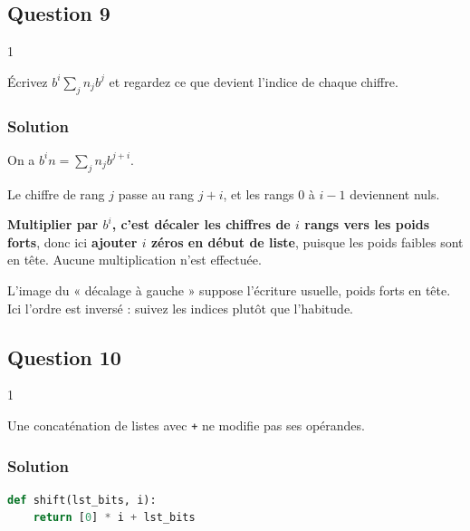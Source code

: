 \documentclass[11pt,a4paper]{article}
\begin{document}
\hypertarget{question-9}{%
\subsection{Question 9}\label{question-9}}

\begin{indication}{1}

Écrivez \(b^i \sum_j n_j b^j\) et regardez ce que devient l'indice de chaque chiffre.

\end{indication}

\hypertarget{solution-8}{%
\subsubsection{Solution}\label{solution-8}}

On a \(b^i n = \sum_j n_j b^{j+i}\).

Le chiffre de rang \(j\) passe au rang \(j+i\), et les rangs \(0\) à \(i-1\) deviennent nuls.

\textbf{Multiplier par \(b^i\), c'est décaler les chiffres de \(i\) rangs vers les poids forts}, donc ici \textbf{ajouter \(i\) zéros en début de liste}, puisque les poids faibles sont en tête. Aucune multiplication n'est effectuée.

\begin{piege}

L'image du « décalage à gauche » suppose l'écriture usuelle, poids forts en tête. Ici l'ordre est inversé : suivez les indices plutôt que l'habitude.

\end{piege}

\hypertarget{question-10}{%
\subsection{Question 10}\label{question-10}}

\begin{indication}{1}

Une concaténation de listes avec \texttt{+} ne modifie pas ses opérandes.

\end{indication}

\hypertarget{solution-9}{%
\subsubsection{Solution}\label{solution-9}}

\begin{lstlisting}[language=Python]
def shift(lst_bits, i):
    return [0] * i + lst_bits
\end{lstlisting}
\end{document}
